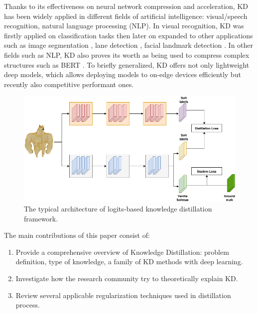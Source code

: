 Thanks to its effectiveness on neural network compression and acceleration, KD has been widely applied in different fields of artificial intelligence: visual/speech recognition, natural language processing (NLP). In visual recognition, KD was firstly applied on classification tasks \cite{hintonfirstkd,visualtask01,visualtask02,visualtask03,visualtask04} then later on expanded to other applications such as image segmentation \cite{segment01}, lane detection \cite{lanedetect01}, facial landmark detection \cite{facial01, facial02}. In other fields such as NLP, KD also proves its worth as being used to compress complex structures such as BERT \cite{nlp01, nlp02}. To briefly generalized, KD offers not only lightweight deep models, which allows deploying models to on-edge devices efficiently but recently also competitive performant ones.
\begin{figure}[h!]
   \begin{center}
      \includegraphics[width=0.8\linewidth]{assets/logits_based.png}
   \end{center}
      \caption{The typical architecture of logits-based knowledge distillation framework.}
   \label{fig:logits_base}
\end{figure}

The main contributions of this paper consist of:
\begin{enumerate}
   \item Provide a comprehensive overview of Knowledge Distillation: problem definition, type of knowledge, a family of KD methods with deep learning.
   \item Investigate how the research community try to theoretically explain KD.
   \item Review several applicable regularization techniques used in distillation process.
\end{enumerate}
